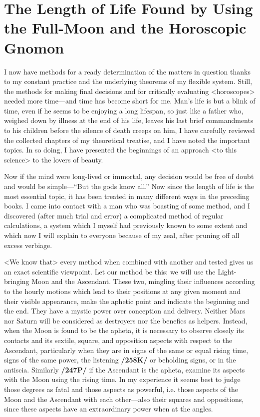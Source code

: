 \section{The Length of Life Found by Using the Full-Moon and the Horoscopic Gnomon}

I now have methods for a ready determination of the matters in question thanks to my constant practice and the underlying theorems of my flexible system. Still, the methods for making final decisions and for critically evaluating <horoscopes> needed more time—and time has become short for me. Man’s life is but a blink of time, even if he seems to be enjoying a long lifespan, so just like a father who, weighed down by illness at the end of his life, leaves his last brief commandments to his children before the silence of death creeps on him, I have carefully reviewed the collected chapters of my theoretical treatise, and I have noted the important topics. In so doing, I have presented the beginnings of an approach <to this science> to the lovers of beauty.

Now if the mind were long-lived or immortal, any decision would be free of doubt and would be simple—“But the gods know all.” Now since the length of life is the most essential topic, it has been treated in many different ways in the preceding books. I came into contact with a man who was boasting of some method, and I discovered (after much trial and error) a complicated method of regular calculations, a system which I myself had previously known to some extent and which now I will explain to everyone because of my zeal, after pruning off all excess verbiage. 

<We know that> every method when combined with another and tested gives us an exact scientific viewpoint. Let our method be this: we will use the Light-bringing Moon and the Ascendant. These two,
mingling their influences according to the hourly motions which lead to their positions at any given moment and their visible appearance, make the aphetic point and indicate the beginning and the end. They have a mystic power over conception and delivery. Neither Mars nor Saturn will be considered as destroyers nor the benefics as helpers. Instead, when the Moon is found to be the apheta, it is necessary to observe closely its contacts and its sextile, square, and opposition aspects with respect to the Ascendant, particularly when they are in signs of the same or equal rising time, signs of the same power, the listening \textbf{/258K/} or beholding signs, or in the antiscia. Similarly \textbf{/247P/} if the Ascendant is the apheta, examine its aspects with the Moon using the rising time. In my experience it seems best to judge those degrees as fatal and those aspects as powerful, i.e. those aspects of the Moon and the Ascendant with each other—also their squares and oppositions, since these aspects have an extraordinary power when at the angles.

